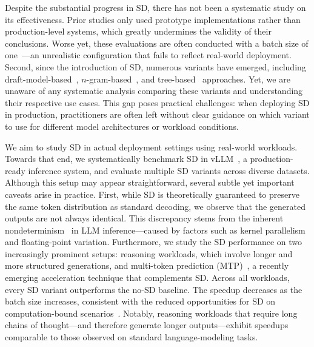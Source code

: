 \documentclass{article}
\newcommand{\jerry}[1]{\textcolor{cyan}{Jerry: #1}}
\newcommand{\alvin}[1]{\textcolor{red}{alvin: #1}}
\begin{document}
Despite the substantial progress in SD, there has not been a systematic study on its effectiveness.
Prior studies only used prototype implementations rather than production-level systems, which greatly undermines the validity of their conclusions. 
Worse yet, these evaluations are often conducted with a batch size of one~\cite{xia-etal-2024-unlocking, cai2024medusa, leviathan2023fast, li2024eagle, li2024eagle2fasterinferencelanguage, li2025eagle3}—an unrealistic configuration that fails to reflect real-world deployment.
Second, since the introduction of SD, numerous variants have emerged, including draft-model-based~\cite{miao2023specinfer, liu2023online, zhou2023distillspec, cascade-inference, chen2024sequoia}, $n$-gram-based~\cite{saxena2023prompt, somasundaram2024pld+}, and tree-based~\cite{cai2024medusa, li2024eagle, lin2024bita, fu2024break, li2024eagle2fasterinferencelanguage, li2025eagle3} approaches. Yet, we are unaware of any systematic analysis comparing these variants and understanding their respective use cases. This gap poses practical challenges: when deploying SD in production, practitioners are often left without clear guidance on which variant to use for different model architectures or workload conditions.

We aim to study SD in actual deployment settings using real-world workloads. Towards that end, we systematically benchmark SD in vLLM~\cite{kwon2023efficient}, a production-ready inference system, and evaluate multiple SD variants across diverse datasets. 
Although this setup may appear straightforward, several subtle yet important caveats arise in practice. %
First, while SD is theoretically guaranteed to preserve the same token distribution as standard decoding, we observe that the generated outputs are not always identical. This discrepancy stems from the inherent nondeterminism~\cite{he2025nondeterminism} in LLM inference—caused by factors such as kernel parallelism and floating-point variation. 
Furthermore, we study the SD performance on two increasingly prominent setups: reasoning workloads, which involve longer and more structured generations, and multi-token prediction (MTP)~\cite{deepseekai2025deepseekv3technicalreport, 5team2025glm45agenticreasoningcoding}, a recently emerging acceleration technique that complements SD.
Across all workloads, every SD variant outperforms the no-SD baseline. The speedup decreases as the batch size increases, consistent with the reduced opportunities for SD on computation-bound scenarios~\cite{liu2024dsd}. Notably, reasoning workloads that require long chains of thought—and therefore generate longer outputs—exhibit speedups comparable to those observed on standard language-modeling tasks.
\end{document}

